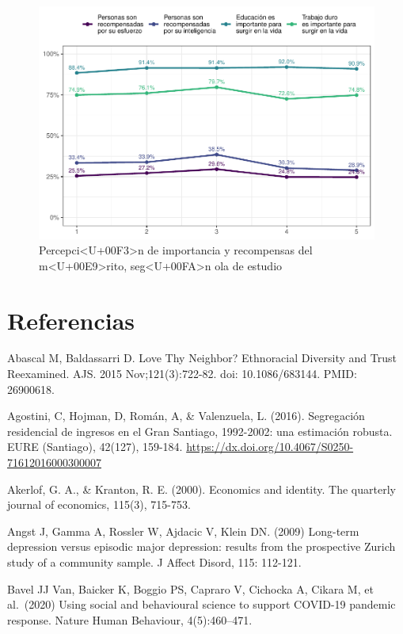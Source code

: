 \documentclass[
  12pt,
]{book}
\begin{document}
\begin{figure}

{\centering \includegraphics{reporte-elsoc_files/figure-latex/merit-wave-1} 

}

\caption{Percepci<U+00F3>n de importancia y recompensas del m<U+00E9>rito, seg<U+00FA>n ola de estudio}\label{fig:merit-wave}
\end{figure}

\hypertarget{referencias}{%
\chapter{Referencias}\label{referencias}}

Abascal M, Baldassarri D. Love Thy Neighbor? Ethnoracial Diversity and Trust Reexamined. AJS. 2015 Nov;121(3):722-82. doi: 10.1086/683144. PMID: 26900618.

Agostini, C, Hojman, D, Román, A, \& Valenzuela, L. (2016). Segregación residencial de ingresos en el Gran Santiago, 1992-2002: una estimación robusta. EURE (Santiago), 42(127), 159-184. \url{https://dx.doi.org/10.4067/S0250-71612016000300007}

Akerlof, G. A., \& Kranton, R. E. (2000). Economics and identity. The quarterly journal of economics, 115(3), 715-753.

Angst J, Gamma A, Rossler W, Ajdacic V, Klein DN. (2009) Long-term depression versus episodic major depression: results from the prospective Zurich study of a community sample. J Affect Disord, 115: 112-121.

Bavel JJ Van, Baicker K, Boggio PS, Capraro V, Cichocka A, Cikara M, et al.~(2020) Using social and behavioural science to support COVID-19 pandemic response. Nature Human Behaviour, 4(5):460--471.
\end{document}
